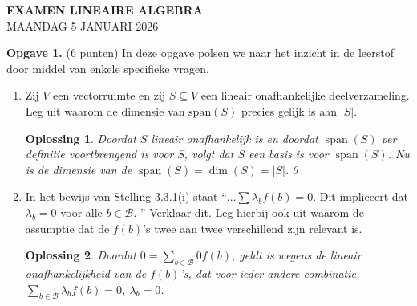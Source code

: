 \documentclass[a4paper,12pt]{article}
\newtheorem{oplossing}{Oplossing}
\begin{document}
\begin{center}
    \Large\textbf{EXAMEN LINEAIRE ALGEBRA} \\[0.5cm]
    \large\textsc{MAANDAG 5 JANUARI 2026} \\[0.5cm]
\end{center}


\textbf{Opgave 1.} (6 punten) In deze opgave polsen we naar het inzicht in de leerstof door middel van enkele specifieke vragen.
\begin{enumerate}
    \item[(i)] Zij $V$ een vectorruimte en zij $S \subseteq V$ een lineair onafhankelijke deelverzameling.
    Leg uit waarom de dimensie van $\text{span}(S)$ precies gelijk is aan $|S|$.
    \begin{oplossing}
        Doordat \(S\) lineair onafhankelijk is en doordat \(\operatorname{span}(S)\) per definitie voortbrengend is voor \(S\),
        volgt dat \(S\) een basis is voor \(\operatorname{span}(S)\). Nu is de dimensie van de \(\operatorname{span}(S) = \dim (S) = |S|\).\qed
    \end{oplossing}
    \item[(ii)] In het bewijs van Stelling 3.3.1(i) staat ``$\dots \sum \lambda_{b}f(b)=0$. Dit impliceert dat $\lambda_{b}=0$ voor alle $b \in \mathcal{B}$.
    '' Verklaar dit. Leg hierbij ook uit waarom de assumptie dat de $f(b)$'s twee aan twee verschillend zijn relevant is.
    \begin{oplossing}
       Doordat \(0= \sum_{b \in \mathcal{B}} 0 f(b)\), geldt is wegens de lineair onafhankelijkheid van de \(f(b)\)'s, dat voor ieder andere combinatie \( \sum_{b \in \mathcal{B}}  \lambda_b f(b) = 0\), \(\lambda_b = 0\).


\end{oplossing}
\end{enumerate}
\end{document}

